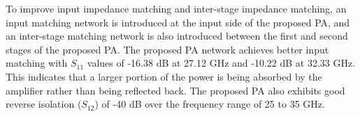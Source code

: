 To improve input impedance matching and inter-stage impedance matching, an input matching network is introduced at the input side of the proposed PA, and an inter-stage matching network is also introduced between the first and second stages of the proposed PA. The proposed PA network achieves better input matching with $S_{11}$ values of -16.38 dB at 27.12 GHz and -10.22 dB at 32.33 GHz. This indicates that a larger portion of the power is being absorbed by the amplifier rather than being reflected back. The proposed PA also exhibits good reverse isolation ($S_{12}$) of -40 dB over the frequency range of 25 to 35 GHz.


